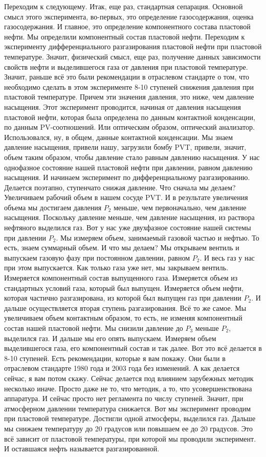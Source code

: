 \documentclass[main.tex]{subfiles}
\begin{document}
Переходим к следующему.
Итак, еще раз, стандартная сепарация.
Основной смысл этого эксперимента, во-первых, это определение газосодержания, оценка газосодержания.
И главное, это определение компонентного состава пластовой нефти.
Мы определили компонентный состав пластовой нефти.
Переходим к эксперименту дифференциального разгазирования пластовой нефти при пластовой температуре.
Значит, физический смысл, еще раз, получение данных зависимости свойств нефти и выделившегося газа от давления при пластовой температуре.
Значит, раньше всё это были рекомендации в отраслевом стандарте о том, что необходимо сделать в этом эксперименте 8-10 ступеней снижения давления при пластовой температуре.
Причем эти значения давления, это ниже, чем давление насыщения.
Этот эксперимент проводится, начиная от давления насыщения пластовой нефти, которая была определена по данным контактной конденсации, по данным PV-соотношений.
Или оптическим образом, оптический анализатор.
Использовался, ну, в общем, данные контактной конденсации.
Мы знаем давление насыщения, привели нашу, загрузили бомбу PVT, привели, значит, объем таким образом, чтобы давление стало равным давлению насыщения.
У нас однофазное состояние нашей пластовой нефти при давлении, равном давлению насыщения.
И начинаем эксперимент по дифференциальному разгазированию.
Делается поэтапно, ступенчато снижая давление.
Что сначала мы делаем?
Увеличиваем рабочий объем в нашем сосуде PVT.
И в результате увеличения объема мы достигаем давления $P_2$ меньше, чем первоначально, чем давление насыщения.
Поскольку давление меньше, чем давление насыщения, из раствора нефтяного выделился газ.
Вот у нас уже двухфазное состояние нашей системы при давлении $P_2$.
Мы измеряем объем, занимаемый газовой частью и нефтью.
То есть, знаем суммарный объем.
И что мы делаем?
Мы открываем вентиль и выпускаем газовую фазу при постоянном давлении, равном $P_2$.
И весь газ у нас при этом выпускается.
Как только газа уже нет, мы закрываем вентиль.
Измеряется компонентный состав выпущенного газа.
Измеряется объем из стандартных условий газа, который был выпущен.
Измеряется объем нефти, которая частично разгазирована, из которой был выпущен газ при давлении $P_2$.
И дальше осуществляется вторая ступень разгазирования.
Всё то же самое.
Мы увеличиваем объем контактным образом, то есть, не изменяя компонентный состав нашей пластовой нефти.
Мы снизили давление до $P_3$ меньше $P_2$, выделился газ.
И дальше мы его опять выпускаем.
Измеряем объем выделившегося газа, его компонентный состав и так далее.
Вот это всё делается в 8-10 ступеней.
Есть рекомендации, которые я вам покажу.
Они были в отраслевом стандарте 1980 года и 2003 года без изменений.
А как делается сейчас, я вам потом скажу.
Сейчас делается под влиянием зарубежных методик несколько иначе.
Просто даже не то, что методик, а то, что усовершенствована аппаратура.
И сейчас просто нет регламента по числу ступеней.
Значит, при атмосферном давлении температура снижается.
Вот мы эксперимент проводим при пластовой температуре.
Достигли одной атмосферы, выделился газ.
Дальше мы снижаем температуру до 20 градусов или повышаем ее до 20 градусов.
Это всё зависит от пластовой температуры, при которой мы проводили эксперимент.
И оставшаяся нефть называется разгазированной.
\end{document}
